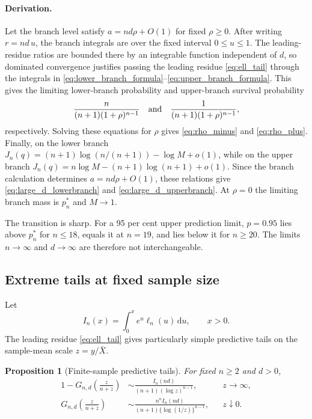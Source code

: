 \documentclass[11pt]{article}
\newtheorem{proposition}[theorem]{Proposition}
\theoremstyle{remark}
\newcommand{\dd}{\,\mathrm d}
\begin{document}
\paragraph{Derivation.}
Let the branch level satisfy $a=nd\rho+O(1)$ for fixed $\rho\ge0$. After writing $r=nd\,u$, the branch integrals are over the fixed interval $0\le u\le1$. The leading-residue ratios are bounded there by an integrable function independent of $d$, so dominated convergence justifies passing the leading residue \eqref{eq:ell_tail} through the integrals in \eqref{eq:lower_branch_formula}--\eqref{eq:upper_branch_formula}. This gives the limiting lower-branch probability and upper-branch survival probability
\[
 \frac{n}{(n+1)(1+\rho)^{n-1}}
 \quad\hbox{and}\quad
 \frac{1}{(n+1)(1+\rho)^{n-1}},
\]
respectively. Solving these equations for $\rho$ gives \eqref{eq:rho_minus} and \eqref{eq:rho_plus}. Finally, on the lower branch $J_n(q)= (n+1)\log(n/(n+1))-\log M+o(1)$, while on the upper branch $J_n(q)=n\log M-(n+1)\log(n+1)+o(1)$. Since the branch calculation determines $a=nd\rho+O(1)$, these relations give \eqref{eq:large_d_lowerbranch} and \eqref{eq:large_d_upperbranch}. At $\rho=0$ the limiting branch mass is $p_n^*$ and $M\to1$.

The transition is sharp. For a 95 per cent upper prediction limit, $p=0.95$ lies above $p_n^*$ for $n\le18$, equals it at $n=19$, and lies below it for $n\ge20$. The limits $n\to\infty$ and $d\to\infty$ are therefore not interchangeable.

\subsection{Extreme tails at fixed sample size}

Let
\begin{equation}
 I_n(x)=\int_0^x e^u\ell_n(u)\dd u,
 \qquad x>0.
 \label{eq:I_n}
\end{equation}
The leading residue \eqref{eq:ell_tail} gives particularly simple predictive tails on the sample-mean scale $z=y/\bar X$.

\begin{proposition}[Finite-sample predictive tails]
\label{prop:tails}
For fixed $n\ge2$ and $d>0$,
\begin{align}
 1-G_{n,d}\!\left(\frac{z}{n+z}\right)
 &\sim \frac{I_n(nd)}{(n+1)(\log z)^{n-1}},
 && z\to\infty,
 \label{eq:upper_log_tail}\\
 G_{n,d}\!\left(\frac{z}{n+z}\right)
 &\sim \frac{n^n I_n(nd)}{(n+1)\{\log(1/z)\}^{n-1}},
 && z\downarrow0.
 \label{eq:lower_log_tail}
\end{align}
\end{proposition}
\end{document}
